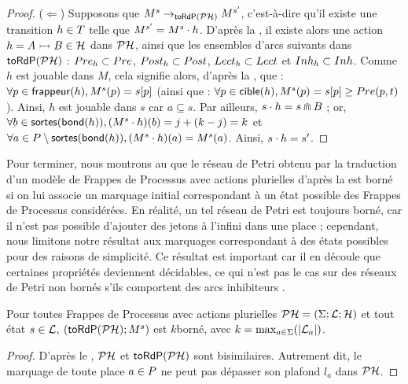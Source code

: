\begin{proof}
  ($\Leftarrow$) Supposons que $M^s \rightarrow_{\mathsf{toRdP}(\mathcal{PH})} M^{s'}$,
    c'est-à-dire qu'il existe une transition $h \in T$ telle que $M^{s'} = M^s \cdot h$.
    D'après la , il existe alors
    une action $h = \mbox{$A \rightarrowtail B$} \in \mathcal{H}$ dans $\mathcal{PH}$,
    ainsi que les ensembles d'arcs suivants dans $\mathsf{toRdP}(\mathcal{PH})$ :
    $Pre_h \subset Pre$, $Post_h \subset Post$,
    $Lect_h \subset Lect$ et $Inh_h \subset Inh$.
    Comme $h$ est jouable dans $M$, cela signifie alors, d'après la , que :
    $\forall p \in \mathsf{frappeur}(h), M^s(p) = {s[p]}$
    (ainsi que : $\forall p \in \mathsf{cible}(h), M^s(p) = {s[p]} \geq Pre(p, t)$).
    Ainsi, $h$ est jouable dans $s$ car $a \subseteq s$.
    Par ailleurs, $s \cdot h = s \Cap B$ ;
    or, $\forall b \in \mathsf{sortes}(\mathsf{bond}(h)), (M^s \cdot h)(b) = j + (k - j) = k$
    et $\forall a \in P \setminus \mathsf{sortes}(\mathsf{bond}(h)), (M^s \cdot h)(a) = M^s(a)$.
    Ainsi, $s \cdot h = s'$.
\end{proof}

Pour terminer, nous montrons au  que le réseau de Petri
obtenu par la traduction d'un modèle de Frappes de Processus avec actions plurielles
d'après la  est borné si on lui associe un marquage
initial correspondant à un état possible des Frappes de Processus considérées.
En réalité, un tel réseau de Petri est toujours borné, car il n'est pas possible
d'ajouter des jetons à l'infini dans une place ;
cependant, nous limitons notre résultat aux marquages correspondant à des états possibles
pour des raisons de simplicité.
Ce résultat est important car il en découle que certaines propriétés deviennent décidables,
ce qui n'est pas le cas sur des réseaux de Petri non bornés s'ils comportent des arcs inhibiteurs
\cite{roux04}.

\begin{theorem}
  Pour toutes Frappes de Processus avec actions plurielles $\mathcal{PH} = (\Sigma; \mathcal{L}; \mathcal{H})$
  et tout état $s \in \mathcal{L}$,
  $(\mathsf{toRdP}(\mathcal{PH}); M^s)$ est $k$\nbd borné,
  avec $k = \max_{a \in \Sigma}(|\mathcal{L}_a|)$.
\end{theorem}

\begin{proof}
  D'après le , $\mathcal{PH}$ et $\mathsf{toRdP}(\mathcal{PH})$ sont bisimilaires.
  Autrement dit, le marquage de toute place $a \in P$ ne peut pas dépasser
  son plafond $l_a$ dans $\mathcal{PH}$.
\end{proof}



